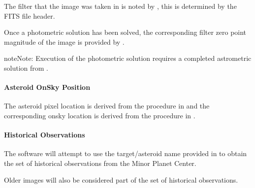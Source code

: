 \documentclass[letterpaper,11pt,english]{sphinxmanual}
\begin{document}
\sphinxAtStartPar
The filter that the image was taken in is noted by , this is
determined by the FITS file header.

\sphinxAtStartPar
Once a photometric solution has been solved, the corresponding filter zero
point magnitude of the image is provided by .

\begin{sphinxadmonition}{note}{Note:}
\sphinxAtStartPar
Execution of the photometric solution requires a completed astrometric
solution from
{\hyperref[\detokenize{user/manual_mode:user-manual-mode-procedure-find-asteroid-location-compute-astrometric-solution}]{}}.
\end{sphinxadmonition}


\paragraph{Asteroid On\sphinxhyphen{}Sky Position}
\label{\detokenize{user/manual_mode:asteroid-on-sky-position}}\label{\detokenize{user/manual_mode:user-manual-mode-procedure-asteroid-on-sky-position}}
\sphinxAtStartPar
The asteroid pixel location is derived from the procedure in
{\hyperref[\detokenize{user/manual_mode:user-manual-mode-procedure-find-asteroid-location-target-selector-gui}]{}}
and the corresponding on\sphinxhyphen{}sky location is derived from the procedure in
{\hyperref[\detokenize{user/manual_mode:user-manual-mode-procedure-find-asteroid-location-compute-astrometric-solution}]{}}.


\paragraph{Historical Observations}
\label{\detokenize{user/manual_mode:historical-observations}}\label{\detokenize{user/manual_mode:user-manual-mode-procedure-historical-observations}}
\sphinxAtStartPar
The software will attempt to use the target/asteroid name provided in
{\hyperref[\detokenize{user/manual_mode:user-manual-mode-procedure-specify-new-target-name}]{}}
to obtain the set of historical observations from the Minor Planet Center.

\sphinxAtStartPar
Older images will also be considered part of the set of historical observations.
\end{document}
